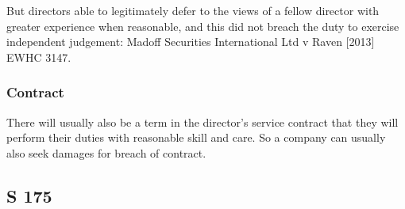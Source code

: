 \documentclass[
]{article}
\begin{document}
But directors able to legitimately defer to the views of a fellow
director with greater experience when reasonable, and this did not
breach the duty to exercise independent judgement: Madoff Securities
International Ltd v Raven {[}2013{]} EWHC 3147.

\hypertarget{contract}{%
\subsubsection{Contract}\label{contract}}

There will usually also be a term in the director's service contract
that they will perform their duties with reasonable skill and care. So a
company can usually also seek damages for breach of contract.

\hypertarget{s-175}{%
\subsection{S 175}\label{s-175}}
\end{document}
